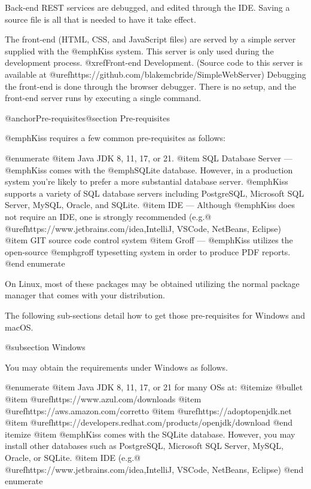 Back-end REST services are debugged, and edited through the IDE.
Saving a source file is all that is needed to have it take effect.

The front-end (HTML, CSS, and JavaScript files) are served by a simple
server supplied with the @emph{Kiss} system.  This server is only used
during the development process.  @xref{Front-end Development}.
(Source code to this server is available at
@uref{https://github.com/blakemcbride/SimpleWebServer}) Debugging the
front-end is done through the browser debugger.  There is no setup,
and the front-end server runs by executing a single command.

@anchor{Pre-requisites}@section Pre-requisites

@emph{Kiss} requires a few common pre-requisites as follows:


@enumerate
@item
Java JDK 8, 11, 17, or 21. 
@item
SQL Database Server --- @emph{Kiss} comes with the @emph{SQLite} database.  However, in a production
system you're likely to prefer a more substantial database server.  @emph{Kiss} supports a variety of SQL database servers including 
PostgreSQL, Microsoft SQL Server, MySQL, Oracle, and SQLite.
@item
IDE --- Although @emph{Kiss} does not require an IDE, one is strongly recommended (e.g.@ @uref{https://www.jetbrains.com/idea,IntelliJ}, VSCode, NetBeans, Eclipse)
@item
GIT source code control system
@item
Groff --- @emph{Kiss} utilizes the open-source @emph{groff} typesetting system in order to produce PDF reports.
@end enumerate

On Linux, most of these packages may be obtained utilizing the normal
package manager that comes with your distribution.

The following sub-sections detail how to get those pre-requisites for Windows and macOS.

@subsection Windows


You may obtain the requirements under Windows as follows.

@enumerate
@item
Java JDK 8, 11, 17, or 21 for many OSs at:
@itemize @bullet
@item
@uref{https://www.azul.com/downloads}
@item
@uref{https://aws.amazon.com/corretto}
@item
@uref{https://adoptopenjdk.net}
@item
@uref{https://developers.redhat.com/products/openjdk/download}
@end itemize
@item
@emph{Kiss} comes with the SQLite database.  However, you may install other databases such as PostgreSQL, Microsoft SQL Server, MySQL,
Oracle, or SQLite.
@item
IDE (e.g.@ @uref{https://www.jetbrains.com/idea,IntelliJ}, VSCode, NetBeans, Eclipse)
@end enumerate

